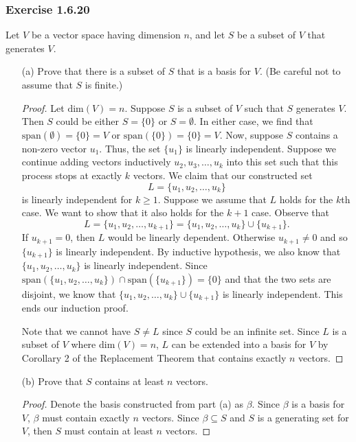 \subsubsection{Exercise 1.6.20} Let \( V  \) be a vector space having dimension \( n  \), and let \( S  \) be a subset of \( V  \) that generates \( V  \).
\begin{enumerate}
    \item[(a)] Prove that there is a subset of \( S  \) that is a basis for \( V  \). (Be careful not to assume that \( S  \) is finite.)
        \begin{proof}
        Let \( \text{dim}(V) = n  \). Suppose \( S  \) is a subset of \( V  \) such that \( S  \) generates \( V  \). Then \( S  \) could be either \( S = \{ 0  \}   \) or \( S = \emptyset \). In either case, we find that \( \text{span}(\emptyset) = \{  0  \}  = V  \) or \( \text{span}(\{ 0 \} ) = \{ 0 \}  = V  \). Now, suppose \( S  \) contains a non-zero vector \( u_{1} \). Thus, the set \( \{ u_{1} \}  \) is linearly independent. Suppose we continue adding vectors inductively \( u_{2}, u_{3} , \dots, u_{k }  \) into this set such that this process stops at exactly \( k  \) vectors. We claim that our constructed set 
        \[  L = \{ u_{1}, u_{2}, \dots, u_{k } \} \] 
        is linearly independent for \( k \geq 1 \). Suppose we assume that \( L  \) holds for the \( k  \)th case. We want to show that it also holds for the \( k + 1  \) case. Observe that
        \[  L = \{ u_{1}, u_{2} , \dots, u_{k+1} \} = \{ u_{1}, u_{2}, \dots, u_{k } \} \cup \{ u_{k+1} \}.  \] If \( u_{k+1} = 0  \), then \( L   \) would be linearly dependent. Otherwise \( u_{k+1} \neq 0  \) and so \( \{ u_{k+1} \}  \) is linearly independent. By inductive hypothesis, we also know that \( \{ u_{1}, u_{2}, \dots, u_{k } \}  \) is linearly independent. Since \( \text{span}(\{ u_{1}, u_{2}, \dots, u_{k } \}) \cap \text{span}(\{ u_{k+1} \} ) = \{ 0 \}  \) and that the two sets are disjoint, we know that \( \{ u_{1}, u_{2}, \dots, u_{k } \} \cup \{ u_{k+1} \}   \) is linearly independent. This ends our induction proof. 

    Note that we cannot have \( S \neq L   \) since \( S  \) could be an infinite set. Since \( L  \) is a subset of \( V  \) where \( \text{dim}(V) = n  \), \( L  \) can be extended into a basis for \( V  \) by Corollary 2 of the Replacement Theorem that contains exactly \( n  \) vectors.
        \end{proof}
    \item[(b)] Prove that \( S  \) contains at least \( n  \) vectors.
        \begin{proof}
        Denote the basis constructed from part (a) as \( \beta \). Since \( \beta \) is a basis for \( V  \), \( \beta \) must contain exactly \( n  \) vectors. Since \( \beta \subseteq S  \) and \( S  \) is a generating set for \( V  \), then \( S  \) must contain at least \( n  \) vectors.
        \end{proof}
\end{enumerate}

